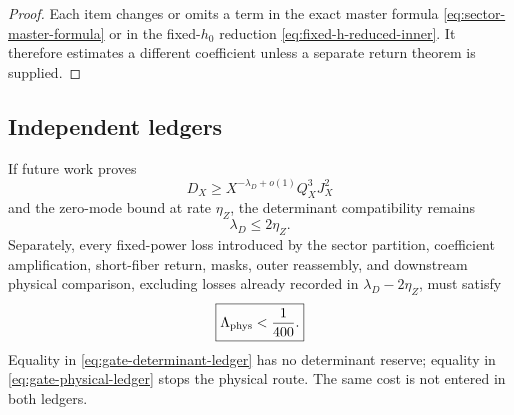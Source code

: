 \begin{proof}
Each item changes or omits a term in the exact master formula
\eqref{eq:sector-master-formula} or in the fixed-\(h_0\) reduction
\eqref{eq:fixed-h-reduced-inner}.  It therefore estimates a different
coefficient unless a separate return theorem is supplied.
\end{proof}

\subsection{Independent ledgers}

If future work proves
\[
 D_X\ge X^{-\lambda_D+o(1)}Q_X^3J_X^2
\]
and the zero-mode bound at rate \(\eta_Z\), the determinant
compatibility remains
\begin{equation}
 \boxed{\lambda_D\le2\eta_Z.}
\label{eq:gate-determinant-ledger}
\end{equation}
Separately, every fixed-power loss introduced by the sector
partition, coefficient amplification, short-fiber return, masks,
outer reassembly, and downstream physical comparison, excluding
losses already recorded in
\(\lambda_D-2\eta_Z\), must satisfy
\begin{equation}
 \boxed{\Lambda_{\rm phys}<\frac1{400}.}
\label{eq:gate-physical-ledger}
\end{equation}
Equality in \eqref{eq:gate-determinant-ledger} has no determinant
reserve; equality in \eqref{eq:gate-physical-ledger} stops the
physical route.  The same cost is not entered in both ledgers.
